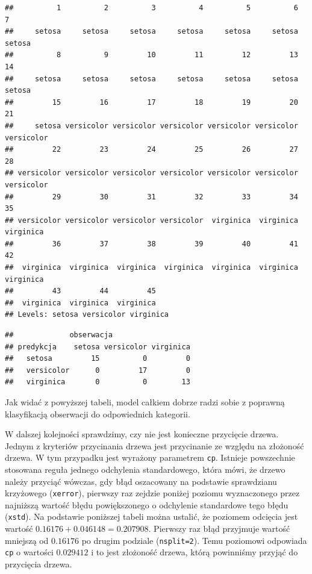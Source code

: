 \documentclass[
]{book}
\newenvironment{Shaded}{\begin{snugshade}}{\end{snugshade}}
\newcommand{\DataTypeTok}[1]{\textcolor[rgb]{0.13,0.29,0.53}{#1}}
\newcommand{\KeywordTok}[1]{\textcolor[rgb]{0.13,0.29,0.53}{\textbf{#1}}}
\newcommand{\NormalTok}[1]{#1}
\newcommand{\OperatorTok}[1]{\textcolor[rgb]{0.81,0.36,0.00}{\textbf{#1}}}
\newcommand{\StringTok}[1]{\textcolor[rgb]{0.31,0.60,0.02}{#1}}
\theoremstyle{plain}
\theoremstyle{definition}
\theoremstyle{definition}
\theoremstyle{definition}
\theoremstyle{definition}
\theoremstyle{remark}
\begin{document}
\begin{verbatim}
##          1          2          3          4          5          6          7 
##     setosa     setosa     setosa     setosa     setosa     setosa     setosa 
##          8          9         10         11         12         13         14 
##     setosa     setosa     setosa     setosa     setosa     setosa     setosa 
##         15         16         17         18         19         20         21 
##     setosa versicolor versicolor versicolor versicolor versicolor versicolor 
##         22         23         24         25         26         27         28 
## versicolor versicolor versicolor versicolor versicolor versicolor versicolor 
##         29         30         31         32         33         34         35 
## versicolor versicolor versicolor versicolor  virginica  virginica  virginica 
##         36         37         38         39         40         41         42 
##  virginica  virginica  virginica  virginica  virginica  virginica  virginica 
##         43         44         45 
##  virginica  virginica  virginica 
## Levels: setosa versicolor virginica
\end{verbatim}

\begin{Shaded}
\end{Shaded}

\begin{verbatim}
##             obserwacja
## predykcja    setosa versicolor virginica
##   setosa         15          0         0
##   versicolor      0         17         0
##   virginica       0          0        13
\end{verbatim}

Jak widać z powyższej tabeli, model całkiem dobrze radzi sobie z poprawną klasyfikacją obserwacji do odpowiednich kategorii.

W dalszej kolejności sprawdzimy, czy nie jest konieczne przycięcie drzewa. Jednym z kryteriów przycinania drzewa jest przycinanie ze względu na złożoność drzewa. W tym przypadku jest wyrażony parametrem \texttt{cp}. Istnieje powszechnie stosowana reguła jednego odchylenia standardowego, która mówi, że drzewo należy przyciąć wówczas, gdy błąd oszacowany na podstawie sprawdzianu krzyżowego (\texttt{xerror}), pierwszy raz zejdzie poniżej poziomu wyznaczonego przez najniższą wartość błędu powiększonego o odchylenie standardowe tego błędu (\texttt{xstd}). Na podstawie poniższej tabeli można ustalić, że poziomem odcięcia jest wartość \(0.16176+0.046148=0.207908\). Pierwszy raz błąd przyjmuje wartość mniejszą od \(0.16176\) po drugim podziale (\texttt{nsplit=2}). Temu poziomowi odpowiada \texttt{cp} o wartości \(0.029412\) i to jest złożoność drzewa, którą powinniśmy przyjąć do przycięcia drzewa.
\end{document}
